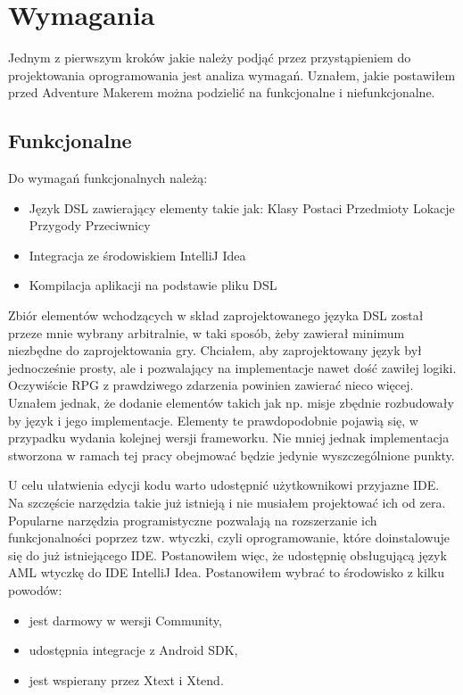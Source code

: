 \documentclass	{xmgr}
\begin{document}
\chapter{Wymagania}

Jednym z pierwszym kroków jakie należy podjąć przez przystąpieniem do projektowania oprogramowania jest analiza wymagań. Uznałem, jakie postawiłem przed Adventure Makerem można podzielić na funkcjonalne i niefunkcjonalne.

\section{Funkcjonalne}
Do wymagań funkcjonalnych należą:
\begin{itemize}
\item Język DSL zawierający elementy takie jak:
\subitem Klasy Postaci
\subitem Przedmioty
\subitem Lokacje
\subitem Przygody
\subitem Przeciwnicy
\item Integracja ze środowiskiem IntelliJ Idea
\item Kompilacja aplikacji na podstawie pliku DSL 
\end{itemize}

Zbiór elementów wchodzących w skład zaprojektowanego języka DSL został przeze mnie wybrany arbitralnie, w taki sposób, żeby zawierał minimum niezbędne do zaprojektowania gry. Chciałem, aby zaprojektowany język był jednocześnie prosty, ale i pozwalający na implementacje nawet dość zawiłej logiki. Oczywiście RPG z prawdziwego zdarzenia powinien zawierać nieco więcej. Uznałem jednak, że dodanie elementów takich jak np. misje zbędnie rozbudowały by język i jego implementacje. Elementy te prawdopodobnie pojawią się, w przypadku wydania kolejnej wersji frameworku. Nie mniej jednak implementacja stworzona w ramach tej pracy obejmować będzie jedynie wyszczególnione punkty.

U celu ułatwienia edycji kodu warto udostępnić użytkownikowi przyjazne IDE. Na szczęście narzędzia takie już istnieją i nie musiałem projektować ich od zera. Popularne narzędzia programistyczne pozwalają na rozszerzanie ich funkcjonalności poprzez tzw. wtyczki, czyli oprogramowanie, które doinstalowuje się do już istniejącego IDE. Postanowiłem więc, że udostępnię obsługującą język AML wtyczkę do IDE IntelliJ Idea. Postanowiłem wybrać to środowisko z kilku powodów:
\begin{itemize}	
\item jest darmowy w wersji Community,
\item udostępnia integracje z Android SDK,
\item jest wspierany przez Xtext i Xtend.
\end{itemize}
\end{document}
